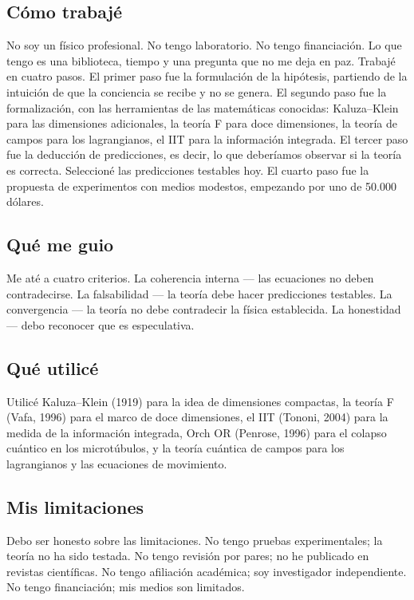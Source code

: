 \documentclass[11pt,a4paper]{article}
\begin{document}
\subsection{Cómo trabajé}
No soy un físico profesional. No tengo laboratorio. No tengo financiación. Lo que tengo es una biblioteca, tiempo y una pregunta que no me deja en paz. Trabajé en cuatro pasos. El primer paso fue la formulación de la hipótesis, partiendo de la intuición de que la conciencia se recibe y no se genera. El segundo paso fue la formalización, con las herramientas de las matemáticas conocidas: Kaluza--Klein para las dimensiones adicionales, la teoría F para doce dimensiones, la teoría de campos para los lagrangianos, el IIT para la información integrada. El tercer paso fue la deducción de predicciones, es decir, lo que deberíamos observar si la teoría es correcta. Seleccioné las predicciones testables hoy. El cuarto paso fue la propuesta de experimentos con medios modestos, empezando por uno de 50.000 dólares.

\subsection{Qué me guio}
Me até a cuatro criterios. La coherencia interna --- las ecuaciones no deben contradecirse. La falsabilidad --- la teoría debe hacer predicciones testables. La convergencia --- la teoría no debe contradecir la física establecida. La honestidad --- debo reconocer que es especulativa.

\subsection{Qué utilicé}
Utilicé Kaluza--Klein (1919) para la idea de dimensiones compactas, la teoría F (Vafa, 1996) para el marco de doce dimensiones, el IIT (Tononi, 2004) para la medida de la información integrada, Orch OR (Penrose, 1996) para el colapso cuántico en los microtúbulos, y la teoría cuántica de campos para los lagrangianos y las ecuaciones de movimiento.

\subsection{Mis limitaciones}
Debo ser honesto sobre las limitaciones. No tengo pruebas experimentales; la teoría no ha sido testada. No tengo revisión por pares; no he publicado en revistas científicas. No tengo afiliación académica; soy investigador independiente. No tengo financiación; mis medios son limitados.
\end{document}
